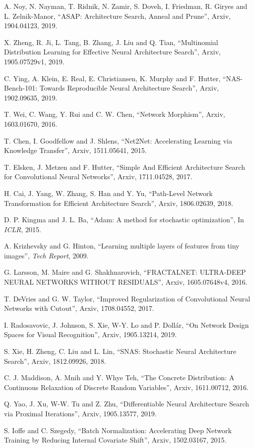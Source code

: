 \documentclass[conference]{IEEEtran}
\begin{document}
\begin{thebibliography}{00}
	 A. Noy, N. Nayman, T. Ridnik, N. Zamir, S. Doveh, I. Friedman, R. Giryes and L. Zelnik-Manor, ``ASAP: Architecture Search, Anneal and Prune'', Arxiv, 1904.04123, 2019.
	
	 X. Zheng, R. Ji, L. Tang, B. Zhang, J. Liu and Q. Tian, ``Multinomial Distribution Learning for Effective Neural Architecture Search'', Arxiv, 1905.07529v1, 2019.
	
	 C. Ying, A. Klein, E. Real, E. Christiansen, K. Murphy and F. Hutter, ``NAS-Bench-101: Towards Reproducible Neural Architecture Search'', Arxiv, 1902.09635, 2019.
	
	 T. Wei, C. Wang, Y. Rui and C. W. Chen, ``Network Morphism'', Arxiv, 1603.01670, 2016.
	
	 T. Chen, I. Goodfellow and J. Shlens, ``Net2Net: Accelerating Learning via Knowledge Transfer'', Arxiv, 1511.05641, 2015.
	
	 T. Elsken, J. Metzen and F. Hutter, ``Simple And Efficient Architecture Search for Convolutional Neural Networks'', Arxiv, 1711.04528, 2017.
	
	 H. Cai, J. Yang, W. Zhang, S. Han and Y. Yu, ``Path-Level Network Transformation for Efficient Architecture Search'', Arxiv, 1806.02639, 2018.
	
	 D. P. Kingma and J. L. Ba, ``Adam: A method for stochastic optimization'', In \textit{ICLR}, 2015.
	
	 A. Krizhevsky and G. Hinton, ``Learning multiple layers of features from tiny images'', \textit{Tech Report}, 2009.
	
	 G. Larsson, M. Maire and G. Shakhnarovich, ``FRACTALNET: ULTRA-DEEP NEURAL NETWORKS WITHOUT RESIDUALS'', Arxiv, 1605.07648v4, 2016.
	
	 T. DeVries and G. W. Taylor, ``Improved Regularization of Convolutional Neural Networks with Cutout'', Arxiv, 1708.04552, 2017.
	
	 I. Radosavovic, J. Johnson, S. Xie, W-Y. Lo and P. Dollár, ``On Network Design Spaces for Visual Recognition'', Arxiv, 1905.13214, 2019.
	
	 S. Xie, H. Zheng, C. Liu and L. Lin, ``SNAS: Stochastic Neural Architecture Search'', Arxiv, 1812.09926, 2018.
	
	 C. J. Maddison, A. Mnih and Y. Whye Teh, ``The Concrete Distribution: A Continuous Relaxation of Discrete Random Variables'', Arxiv, 1611.00712, 2016.
	
	
	
	 Q. Yao, J. Xu, W-W. Tu and Z. Zhu, ``Differentiable Neural Architecture Search via Proximal Iterations'', Arxiv, 1905.13577, 2019.
	
	 S. Ioffe and C. Szegedy, ``Batch Normalization: Accelerating Deep Network Training by Reducing Internal Covariate Shift'', Arxiv, 1502.03167, 2015.
	
\end{thebibliography}
\end{document}
